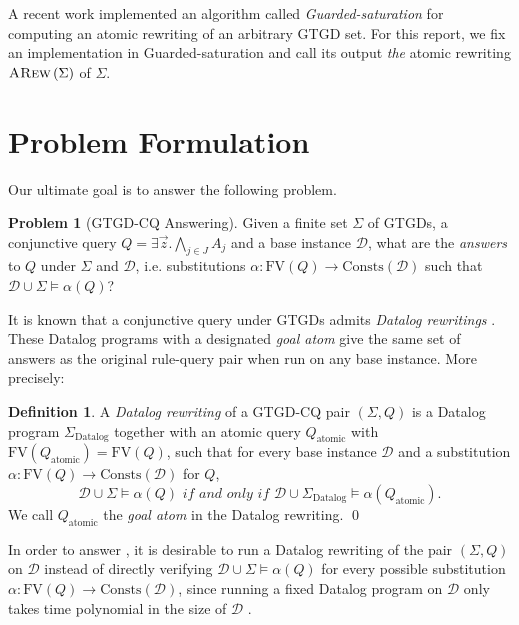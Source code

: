 \documentclass[12pt]{report}
\theoremstyle{plain}
\theoremstyle{definition}
\newtheorem{problem}[theorem]{Problem}
\newtheorem{definition}[theorem]{Definition}
\def\FV{{\mathrm{FV}}}
\def\Consts{{\mathrm{Consts}}}
\newcommand{\ARew}[1]{\ensuremath{\normalfont{\textsc{ARew}} \left( #1 \right)}}
\begin{document}
A recent work \cite{benedikt_buron_germano_kappelmann_motik_2022} implemented an algorithm called \emph{Guarded-saturation} for computing an atomic rewriting of an arbitrary GTGD set. For this report, we fix an implementation in Guarded-saturation and call its output \emph{the} atomic rewriting $\ARew{\Sigma}$ of $\Sigma$.

\section{Problem Formulation}

Our ultimate goal is to answer the following problem.

\begin{problem}[GTGD-CQ Answering]
\label{GTGD-CQ-Answering}
  Given a finite set $\Sigma$ of GTGDs, a conjunctive query $Q = \exists \vec{z}. \bigwedge_{j \in J} A_j$ and a base instance $\mathcal{D}$, what are the \emph{answers} to $Q$ under $\Sigma$ and $\mathcal{D}$, i.e. substitutions $\alpha: \FV(Q) \rightarrow \Consts(\mathcal{D})$ such that $\mathcal{D} \cup \Sigma \models \alpha(Q)$?
\end{problem}

It is known that a conjunctive query under GTGDs admits \emph{Datalog rewritings} \cite{barany_benedikt_cate_2013}. These Datalog programs with a designated \emph{goal atom} give the same set of answers as the original rule-query pair when run on any base instance. More precisely:

\begin{definition}
  A \emph{Datalog rewriting} of a GTGD-CQ pair $(\Sigma, Q)$ is a Datalog program $\Sigma_\mathrm{Datalog}$ together with an atomic query $Q_\mathrm{atomic}$ with $\FV(Q_\mathrm{atomic}) = \FV(Q)$, such that for every base instance $\mathcal{D}$ and a substitution $\alpha: \FV(Q) \rightarrow \Consts(\mathcal{D})$ for $Q$, $$\mathcal{D} \cup \Sigma \models \alpha(Q) \textit{ if and only if } \mathcal{D} \cup \Sigma_\mathrm{Datalog} \models \alpha(Q_\mathrm{atomic}).$$
  We call $Q_\mathrm{atomic}$ the \emph{goal atom} in the Datalog rewriting.
  \qed
\end{definition}

In order to answer , it is desirable to run a Datalog rewriting of the pair $(\Sigma, Q)$ on $\mathcal{D}$ instead of directly verifying $\mathcal{D} \cup \Sigma \models \alpha(Q)$ for every possible substitution $\alpha: \FV(Q) \rightarrow \Consts(\mathcal{D})$, since running a fixed Datalog program on $\mathcal{D}$ only takes time polynomial in the size of $\mathcal{D}$ \cite{dantsin_eiter_gottlob_voronkov_2001}.
\end{document}
